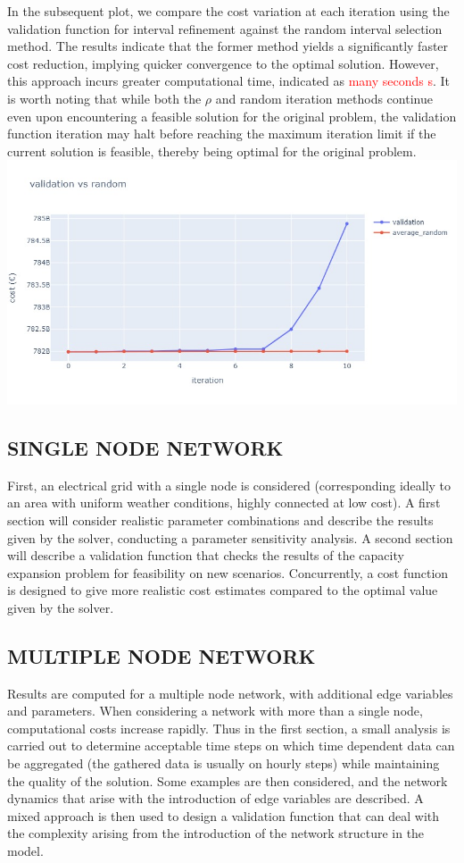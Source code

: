 In the subsequent plot, we compare the cost variation at each iteration using the validation function for interval refinement against the random interval selection method. The results indicate that the former method yields a significantly faster cost reduction, implying quicker convergence to the optimal solution. However, this approach incurs greater computational time, indicated as \textcolor{red}{many seconds s}. It is worth noting that while both the \(\rho\) and random iteration methods continue even upon encountering a feasible solution for the original problem, the validation function iteration may halt before reaching the maximum iteration limit if the current solution is feasible, thereby being optimal for the original problem.
\includegraphics[width=\textwidth]{images/val_vs_average2.png}

\subsection{SINGLE NODE NETWORK}
First, an electrical grid with a single node is considered (corresponding ideally to an area with uniform
weather conditions, highly connected at low cost). A first section will consider realistic parameter
combinations and describe the results given by the solver, conducting a parameter sensitivity analysis. A
second section will describe a validation function that checks the results of the capacity expansion
problem for feasibility on new scenarios. Concurrently, a cost function is designed to give more realistic
cost estimates compared to the optimal value given by the solver.
\subsection{MULTIPLE NODE NETWORK}
Results are computed for a multiple node network, with additional edge variables and parameters. When
considering a network with more than a single node, computational costs increase rapidly. Thus in the
first section, a small analysis is carried out to determine acceptable time steps on which time dependent
data can be aggregated (the gathered data is usually on hourly steps) while maintaining the quality of the
solution. Some examples are then considered, and the network dynamics that arise with the introduction
of edge variables are described. A mixed approach is then used to design a validation function that can
deal with the complexity arising from the introduction of the network structure in the model.
